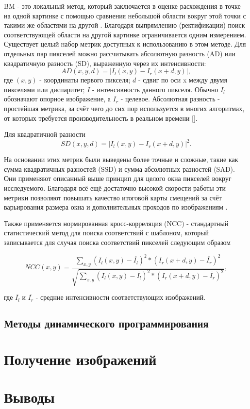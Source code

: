 BM - это локальный метод, который заключается в оценке расхождения в точке на одной картинке с помощью сравнения небольшой области вокруг этой точки с такими же областями 
на другой \cite{}. Благодаря выпрямлению (ректификации) поиск соответствующей области на другой картинке ограничивается одним измерением. Существует целый набор метрик доступных 
к использованию в этом методе. 
Для отдельных пар пикселей можно рассчитывать абсолютную разность (AD) или квадратичную разность (SD), выраженную через их интенсивности:
\begin{equation}
	AD(x, y, d) = |I_l(x,y) - I_r(x+d, y)|,			
	\label{eq:AD}
\end{equation}
где $(x, y)$ - координаты первого пикселя; $d$ - сдвиг по оси x между двумя пикселями или диспаритет; $I$ - интенсивность данного пикселя. Обычно $I_l$ обозначают опорное изображение, а $I_r$ - 
целевое. Абсолютная разность - простейшая метрика, за счёт чего до сих пор используется в многих алгоритмах, от которых требуется производительность в реальном времени []. 

Для квадратичной разности 
\begin{equation}
	SD(x, y, d) = |I_l(x,y) - I_r(x+d, y)|^2.		
	\label{eq:SD}
\end{equation}

На основании этих метрик были выведены более точные и сложные, такие как сумма квадратичных разностей (SSD) и сумма абсолютных разностей (SAD). Они применяют описанный выше принцип для целого 
окна пикселей вокруг исследуемого. Благодаря всё ещё достаточно высокой скорости работы эти метрики позволяют повышать качество итоговой карты смещений за счёт варьирования размера окна и 
дополнительных проходов по изображениям \cite{}. 

Также применяется нормированная кросс-корреляция (NCC) - стандартный статистический метод для поиска соответствий с шаблоном, который записывается для случая поиска соответствий пикселей следующим образом 

\begin{equation}
	NCC(x, y) = \frac{ \sum_{x, y}^{} (I_l(x, y) - \overline{I_l} )^2 * ( I_r(x + d, y) - \overline{I_r} )^2   }{ \sqrt{ \sum_{x, y}^{} (I_l(x, y) - \overline{I_l} )^2 * ( I_r(x + d, y) - \overline{I_r} )^2 }  }, 
	\label{equ:NCC}
\end{equation}

где $\overline{I_l}$ и $\overline{I_r}$ - средние интенсивности соответствующих изображений. 

\subsection{Методы динамического программирования}



\section{Получение изображений}


\section{Выводы}

\newpage




